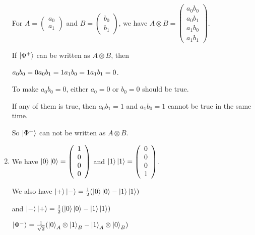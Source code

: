 \documentclass{article}
\begin{document}
\begin{enumerate}
          For $A=\left(\begin{array}{c}
                      a_0 \\a_1
                  \end{array}\right)$ and $B=\left(\begin{array}{c}
                      b_0 \\b_1
                  \end{array}\right)$,
        we have $A\otimes B=\left(\begin{array}{c}
            a_0b_0\\a_0b_1\\a_1b_0\\a_1b_1
        \end{array}\right)$.

        If $\ket{\Phi^+}$ can be written as $A\otimes B$, then
        
        $a_0b_0=0\\a_0b_1=1\\a_1b_0=1\\a_1b_1=0$.

        To make $a_0b_0=0$, either $a_0=0$ or $b_0=0$ should be true.

        If any of them is true, then $a_0b_1=1$ and $a_1b_0=1$ cannot be true in the same time.

        So $\ket{\Phi^+}$ can not be written as $A\otimes B$.
        \item We have $\ket{0}\ket{0}=\left(\begin{array}{c}
            1\\0\\0\\0
        \end{array}\right)$ and $\ket{1}\ket{1}=\left(\begin{array}{c}
            0\\0\\0\\1
        \end{array}\right)$.

        We also have
        $\ket{+}\ket{-}=\frac{1}{2}(\ket{0}\ket{0}-\ket{1}\ket{1})$

        and $\ket{-}\ket{+}=\frac{1}{2}(\ket{0}\ket{0}-\ket{1}\ket{1})$
        
        $\ket{\Phi^-}=\frac{1}{\sqrt{2}}(\ket{0}_A\otimes\ket{1}_B-\ket{1}_A\otimes\ket{0}_B)$
        

\end{enumerate}
\end{document}
